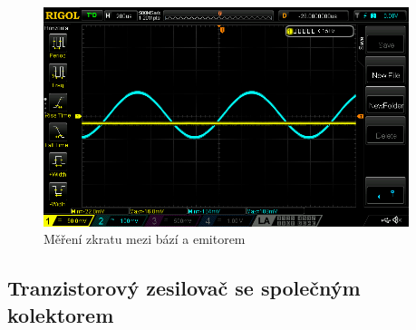 \documentclass{article}
\begin{document}
\begin{figure}[H]
  \centering
  \includegraphics[width=0.95\textwidth]{mereni/NewFolder1/NewFile7.png}
  \caption{Měření zkratu mezi bází a emitorem}
  \label{fig:m-sch-se-p1}
\end{figure}


\subsection*{Tranzistorový zesilovač se společným kolektorem}
\end{document}
